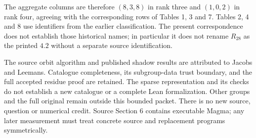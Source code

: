 \documentclass[11pt,a4paper]{article}
\begin{document}
The aggregate columns are therefore $(8,3,8)$ in rank three and $(1,0,2)$
in rank four, agreeing with the corresponding rows of Tables 1, 3 and 7.
Tables 2, 4 and 8 use identifiers from the earlier classification. The
present correspondence does not establish those historical names; in
particular it does not rename $R_{28}$ as the printed $4.2$ without a
separate source identification.

The source orbit algorithm and published shadow results are attributed
to Jacobs and Leemans. Catalogue completeness, its subgroup-data trust
boundary, and the full accepted residue proof are retained. The sparse
representation and its checks do not establish a new catalogue or a
complete Lean formalization. Other groups and the full original remain
outside this bounded packet. There is no new source, question or numerical
credit. Source Section 6 contains executable Magma; any later measurement
must treat concrete source and replacement programs symmetrically.
\end{document}
